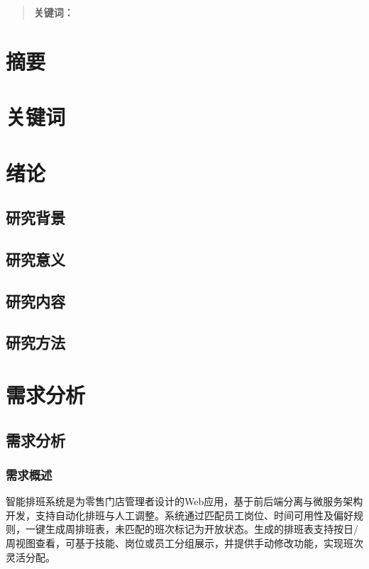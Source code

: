 \documentclass{ctexart}
\begin{document}
\begin{abstract}
\par\textbf{关键词：} %
\end{abstract}

\section*{摘要}
\section*{关键词}

\section{绪论}
\subsection{研究背景}
\subsection{研究意义}
\subsection{研究内容}
\subsection{研究方法}

\section{需求分析}
\subsection{需求分析}
\subsubsection{需求概述}
智能排班系统是为零售门店管理者设计的Web应用，基于前后端分离与微服务架构开发，支持自动化排班与人工调整。系统通过匹配员工岗位、时间可用性及偏好规则，一键生成周排班表，未匹配的班次标记为开放状态。生成的排班表支持按日/周视图查看，可基于技能、岗位或员工分组展示，并提供手动修改功能，实现班次灵活分配。
\end{document}
